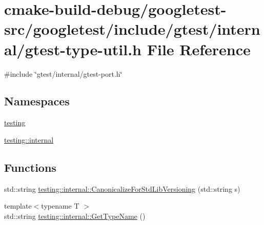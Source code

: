 \hypertarget{gtest-type-util_8h}{}\section{cmake-\/build-\/debug/googletest-\/src/googletest/include/gtest/internal/gtest-\/type-\/util.h File Reference}
\label{gtest-type-util_8h}
{\ttfamily \#include \char`\"{}gtest/internal/gtest-\/port.\+h\char`\"{}}\newline
\subsection*{Namespaces}
\begin{DoxyCompactItemize}
\item 
 \mbox{\hyperlink{namespacetesting}{testing}}
\item 
 \mbox{\hyperlink{namespacetesting_1_1internal}{testing\+::internal}}
\end{DoxyCompactItemize}
\subsection*{Functions}
\begin{DoxyCompactItemize}
\item 
std\+::string \mbox{\hyperlink{namespacetesting_1_1internal_a5342e843f087081705094beae07b557b}{testing\+::internal\+::\+Canonicalize\+For\+Std\+Lib\+Versioning}} (std\+::string s)
\item 
{\footnotesize template$<$typename T $>$ }\\std\+::string \mbox{\hyperlink{namespacetesting_1_1internal_a635606b4731f843c86ec8ca51cab83a1}{testing\+::internal\+::\+Get\+Type\+Name}} ()
\end{DoxyCompactItemize}
